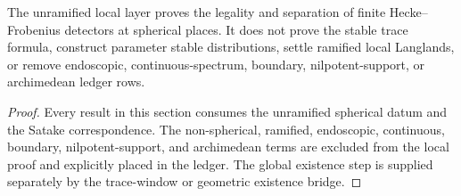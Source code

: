 \begin{theorem}
\label{thm:unified-reality-unramified-local-boundary}
The unramified local layer proves the legality and separation of finite
Hecke--Frobenius detectors at spherical places. It does not prove the
stable trace formula, construct parameter stable distributions, settle
ramified local Langlands, or remove endoscopic, continuous-spectrum,
boundary, nilpotent-support, or archimedean ledger rows.
\end{theorem}
\begin{proof}
Every result in this section consumes the unramified spherical datum and
the Satake correspondence. The non-spherical, ramified, endoscopic,
continuous, boundary, nilpotent-support, and archimedean terms are
excluded from the local proof and explicitly placed in the ledger. The
global existence step is supplied separately by the trace-window or
geometric existence bridge.
\end{proof}
